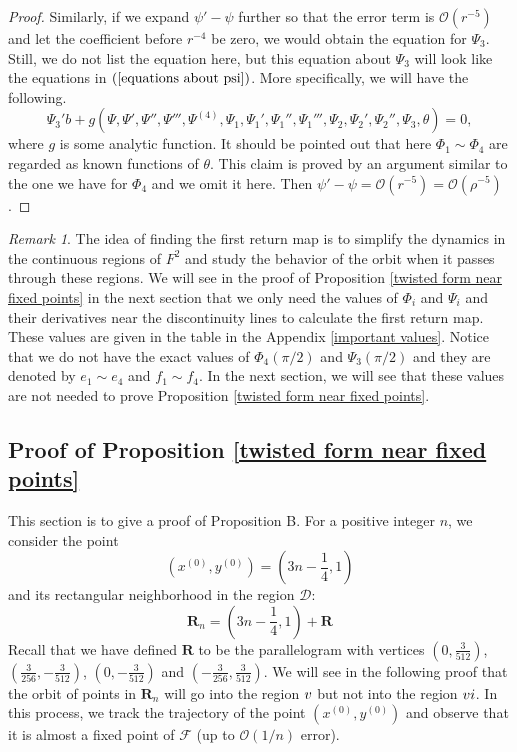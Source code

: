 \documentclass{article}
\def \Rfive{\uppercase\expandafter{\romannumeral5}}
\def \Rsix{\uppercase\expandafter{\romannumeral6}}
\numberwithin{figure}{section}
\numberwithin{equation}{section}
\theoremstyle{remark}
\newtheorem*{remark}{Remark}
\theoremstyle{definition}
\begin{document}
{\begin{proof}
     Similarly, if we expand $\psi'-\psi$ further so that the error term is $\mathcal{O}(r^{-5})$ and let the coefficient before $r^{-4}$ be zero, we would obtain the equation for $\Psi_3$. Still, we do not list the equation here, but this equation about $\Psi_3$ will look like the equations in $(\ref{equations about psi})$. More specifically, we will have the following.
     \begin{equation}
     \Psi_3'b+g(\Psi,\Psi',\Psi'',\Psi''',\Psi^{(4)},\Psi_1,\Psi_1',\Psi_1'',\Psi_1''',\Psi_2,\Psi_2',\Psi_2'',\Psi_3,\theta)=0,
    \end{equation}
    where $g$ is some analytic function.
    It should be pointed out that here $\Phi_1 \sim\Phi_4$ are regarded as known functions of $\theta$. This claim is proved by an argument similar to the one we have for $\Phi_4$ and we omit it here. Then $\psi'-\psi=\mathcal{O}(r^{-5})=\mathcal{O}(\rho^{-5})$.
\end{proof}
}
\begin{remark}
  The idea of finding the first return map is to simplify the dynamics in the continuous regions of $F^2$ and study the behavior of the orbit when it passes through these regions. We will see in the  proof of Proposition \ref{twisted form near fixed points} in the next section that we only need the values of $\Phi_i$ and $\Psi_i$ and their derivatives near the discontinuity lines to calculate the first return map. These values are given in the table in the Appendix \ref{important values}. Notice that we do not have the exact values of $\Phi_4(\pi/2)$ and $\Psi_3(\pi/2)$ and they are denoted by $e_1\sim e_4$ and $f_1\sim f_4$. In the next section, we will see that these values are not needed to prove Proposition \ref{twisted form near fixed points}.
\end{remark}
\subsection{{\color{red}Proof of Proposition \texorpdfstring{\ref{twisted form near fixed points}}{}}}\label{calculation}
This section is to give a proof of Proposition B.
    For a positive integer $n$, we consider the point $$(x^{(0)},y^{(0)})=\left(3n-\frac{1}{4},1\right)$$ and its rectangular neighborhood in the region $\mathcal{D}$:
        $$\mathbf{R}_{n}=\left(3n-\frac{1}{4},1\right)+\mathbf{R}$$
    Recall that we have defined $\mathbf{R}$ to be the parallelogram with vertices $\left(0,\frac{3}{512}\right)$,  $\left(\frac{3}{256},-\frac{3}{512}\right)$, $\left(0,-\frac{3}{512}\right)$ and $\left(-\frac{3}{256},\frac{3}{512}\right)$.
    We will see in the following proof that the orbit of points in $\mathbf{R}_{n}$ will go into the region $\Rfive$ but not into the region $\Rsix$. In this process, we track the trajectory of the point $(x^{(0)},y^{(0)})$ and observe that it is almost a fixed point of $\mathcal{F}$ (up to $\mathcal{O}(1/n)$ error). 
\end{document}
